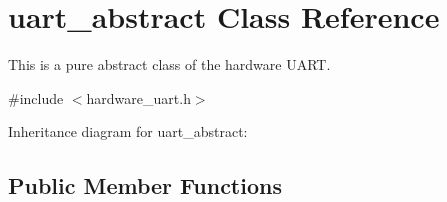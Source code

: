 \hypertarget{classuart__abstract}{}\section{uart\+\_\+abstract Class Reference}
\label{classuart__abstract}


This is a pure abstract class of the hardware U\+A\+RT.  




{\ttfamily \#include $<$hardware\+\_\+uart.\+h$>$}



Inheritance diagram for uart\+\_\+abstract\+:
\subsection*{Public Member Functions}
